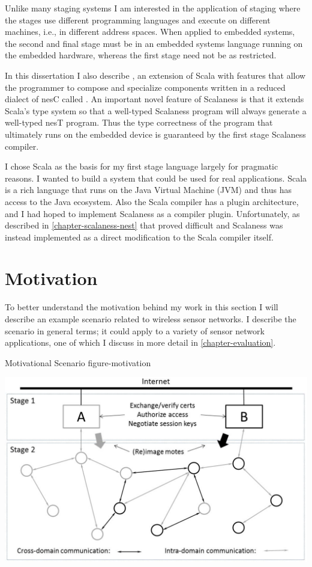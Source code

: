 Unlike many staging systems I am interested in the application of staging where the stages use
different programming languages and execute on different machines, i.e., in different address
spaces. When applied to embedded systems, the second and final stage must be in an embedded
systems language running on the embedded hardware, whereas the first stage need not be as
restricted.

In this dissertation I also describe  \cite{chapin-GPCE-2013}, an extension
of Scala \cite{PiS2} with features that allow the programmer to compose and specialize
components written in a reduced dialect of nesC called . An important novel
feature of Scalaness is that it extends Scala's type system so that a well-typed Scalaness
program will always generate a well-typed nesT program. Thus the type correctness of the program
that ultimately runs on the embedded device is guaranteed by the first stage Scalaness compiler.

I chose Scala as the basis for my first stage language largely for pragmatic reasons. I wanted
to build a system that could be used for real applications. Scala is a rich language that runs
on the Java Virtual Machine (JVM) and thus has access to the Java ecosystem. Also the Scala
compiler has a plugin architecture, and I had hoped to implement Scalaness as a compiler plugin.
Unfortunately, as described in \autoref{chapter-scalaness-nest} that proved difficult and
Scalaness was instead implemented as a direct modification to the Scala compiler itself.

\section{Motivation}

To better understand the motivation behind my work in this section I will describe an example
scenario related to wireless sensor networks. I describe the scenario in general terms; it could
apply to a variety of sensor network applications, one of which I discuss in more detail in
\autoref{chapter-evaluation}.

\begin{fpfig*}[t]
  {Motivational Scenario}
  {figure-motivation}
  \begin{center}
    \includegraphics[scale=.40]{Figures/spartanrpc.eps}
  \end{center}
\end{fpfig*}

